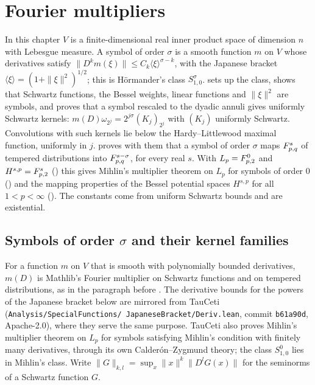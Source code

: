 \chapter{Fourier multipliers}
\label{ch:fourier-multipliers}

In this chapter $V$ is a finite-dimensional real inner product space of dimension $n$ with
Lebesgue measure. A symbol of order $\sigma$ is a smooth function $m$ on $V$ whose derivatives
satisfy $\|D^k m(\xi)\| \leq C_k \langle \xi \rangle^{\sigma - k}$, with the Japanese bracket
$\langle \xi \rangle = (1 + \|\xi\|^2)^{1/2}$; this is H\"ormander's class
$S^\sigma_{1,0}$.  sets up the class, shows that
Schwartz functions, the Bessel weights, linear functions and $\|\xi\|^2$ are symbols, and proves
that a symbol rescaled to the dyadic annuli gives uniformly Schwartz kernels:
$m(D) \omega_{2^j} = 2^{j\sigma} (K_j)_{2^j}$ with $(K_j)$ uniformly Schwartz. Convolutions with
such kernels lie below the Hardy--Littlewood maximal function, uniformly in $j$.
 proves with them that a symbol of order $\sigma$ maps $F^{s}_{p,q}$ of
tempered distributions into $F^{s-\sigma}_{p,q}$, for every real $s$. With
$L_p = F^{0}_{p,2}$ and $H^{s,p} = F^{s}_{p,2}$ () this
gives Mihlin's multiplier theorem on $L_p$ for symbols of order $0$
() and the mapping properties of the Bessel potential spaces
$H^{s,p}$ for all $1 < p < \infty$ (). The constants come
from uniform Schwartz bounds and are existential.

\section{Symbols of order \texorpdfstring{$\sigma$}{sigma} and their kernel families}
\label{sec:symbol-classes}

For a function $m$ on $V$ that is smooth with polynomially bounded derivatives, $m(D)$ is Mathlib's
Fourier multiplier on Schwartz functions and on tempered distributions, as in the paragraph before
. The derivative bounds for the powers of the Japanese bracket
below are mirrored from TauCeti (\texttt{Analysis/\allowbreak SpecialFunctions/\allowbreak
JapaneseBracket/\allowbreak Deriv.lean}, commit \texttt{b61a90d}, Apache-2.0), where they serve the
same purpose. TauCeti also proves Mihlin's multiplier theorem on $L_p$ for symbols satisfying
Mihlin's condition with finitely many derivatives, through its own Calder\'on--Zygmund theory;
the class $S^0_{1,0}$ lies in Mihlin's class. Write $\|G\|_{k,l} = \sup_x \|x\|^k \|D^l G(x)\|$
for the seminorms of a Schwartz function $G$.

